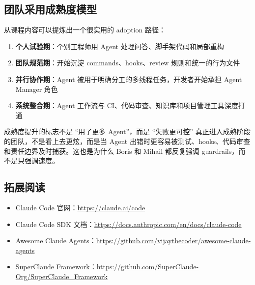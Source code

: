 \documentclass[a4paper]{article}
\begin{document}
\subsection{团队采用成熟度模型}

从课程内容可以提炼出一个很实用的 adoption 路径：

\begin{enumerate}
    \item \textbf{个人试验期}：个别工程师用 Agent 处理问答、脚手架代码和局部重构
    \item \textbf{团队规范期}：开始沉淀 commands、hooks、review 规则和统一的行为文件
    \item \textbf{并行协作期}：Agent 被用于明确分工的多线程任务，开发者开始承担 Agent Manager 角色
    \item \textbf{系统整合期}：Agent 工作流与 CI、代码审查、知识库和项目管理工具深度打通
\end{enumerate}

\begin{knowledgebox}{成熟度提升的标志不是 ``用了更多 Agent''，而是 ``失败更可控''}
真正进入成熟阶段的团队，不是看上去更炫，而是当 Agent 出错时更容易被测试、hooks、代码审查和责任边界及时捕获。这也是为什么 Boris 和 Mihail 都反复强调 guardrails，而不是只强调速度。
\end{knowledgebox}

\subsection{拓展阅读}

\begin{itemize}
    \item Claude Code 官网：\url{https://claude.ai/code}
    \item Claude Code SDK 文档：\url{https://docs.anthropic.com/en/docs/claude-code}
    \item Awesome Claude Agents：\url{https://github.com/vijaythecoder/awesome-claude-agents}
    \item SuperClaude Framework：\url{https://github.com/SuperClaude-Org/SuperClaude_Framework}
\end{itemize}

\end{document}
